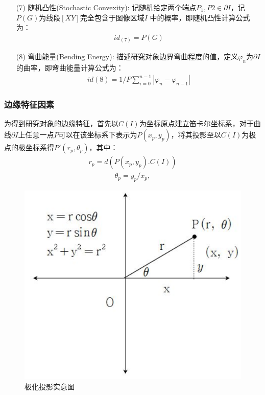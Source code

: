 \documentclass{whutmod}
\begin{document}
\begin{itemize}
		\item[(7)]随机凸性(Stochastic Convexity):
		记随机给定两个端点$P_{1},P{2}\in\partial I$，记$P(G)$为线段$[XY]$完全包含于图像区域$I$ 中的概率，即随机凸性计算公式为：
		\begin{gather}
		id_(7)=P(G)
		\end{gather}
		
		\item[(8)]弯曲能量(Bending Energy):
		描述研究对象边界弯曲程度的值，定义$\varphi _{n}$为$\partial I$的曲率，即弯曲能量计算公式为：
		\begin{gather}	
		id( 8 ) = 1 / P \sum _ { i = 0 } ^ { n - 1 } \left|\varphi _{n} -\varphi _{n-1}\right|
		\end{gather}
		
		
		
		
		
		\end{itemize}	

	

		\subsubsection{边缘特征因素}
		为得到研究对象的边缘特征，首先以$C(I)$为坐标原点建立笛卡尔坐标系，对于曲线$\partial I$上任意一点$P$可以在该坐标系下表示为$P(x_{p},y_{p})$，将其投影至以$C(I)$为极点的极坐标系得${P}'(r_{p},\theta _{p})$，其中：
		\begin{gather}
		r_{p}=d(P(x_{p},y_{p}).C(I))
		\end{gather}
		\begin{gather}
		\theta _{p}=y_{p}/x_{p},
		\end{gather}
		
	  \begin{figure}[H]
		\centering
		\includegraphics[width=.6\textwidth]{figures/jihua.png}
		\caption{极化投影实意图}\label{66}
	\end{figure}
		
\end{document}
